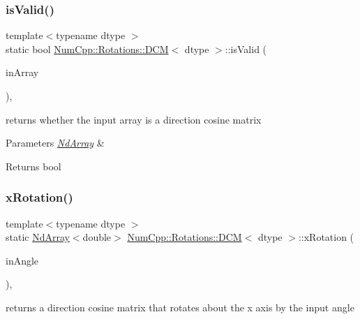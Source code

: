 \subsubsection{\texorpdfstring{is\+Valid()}{isValid()}}
{\footnotesize\ttfamily template$<$typename dtype $>$ \\
static bool \mbox{\hyperlink{class_num_cpp_1_1_rotations_1_1_d_c_m}{Num\+Cpp\+::\+Rotations\+::\+D\+CM}}$<$ dtype $>$\+::is\+Valid (\begin{DoxyParamCaption}\item[{const \mbox{\hyperlink{class_num_cpp_1_1_nd_array}{Nd\+Array}}$<$ dtype $>$ \&}]{in\+Array }\end{DoxyParamCaption})\hspace{0.3cm}{\ttfamily [inline]}, {\ttfamily [static]}}

returns whether the input array is a direction cosine matrix


\begin{DoxyParams}{Parameters}
{\em \mbox{\hyperlink{class_num_cpp_1_1_nd_array}{Nd\+Array}}} & \\
\hline
\end{DoxyParams}
\begin{DoxyReturn}{Returns}
bool 
\end{DoxyReturn}
\mbox{\label{class_num_cpp_1_1_rotations_1_1_d_c_m_aa8a963c18f3dde1fa4fd37f5dd1d976e}} 
\subsubsection{\texorpdfstring{x\+Rotation()}{xRotation()}}
{\footnotesize\ttfamily template$<$typename dtype $>$ \\
static \mbox{\hyperlink{class_num_cpp_1_1_nd_array}{Nd\+Array}}$<$double$>$ \mbox{\hyperlink{class_num_cpp_1_1_rotations_1_1_d_c_m}{Num\+Cpp\+::\+Rotations\+::\+D\+CM}}$<$ dtype $>$\+::x\+Rotation (\begin{DoxyParamCaption}\item[{double}]{in\+Angle }\end{DoxyParamCaption})\hspace{0.3cm}{\ttfamily [inline]}, {\ttfamily [static]}}

returns a direction cosine matrix that rotates about the x axis by the input angle


